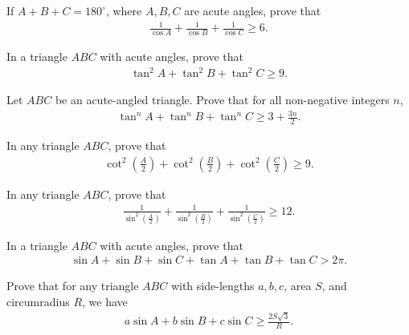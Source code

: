 \begin{question}
    If $A+B+C=180^\circ$, where $A,B,C$ are acute angles, prove that
    \begin{align*}
        \frac{1}{\cos A}+\frac{1}{\cos B}+\frac{1}{\cos C} \geq 6.
    \end{align*}
\end{question}


\begin{question}
    In a triangle $ABC$ with acute angles, prove that
    \begin{align*}
        \tan^2 A + \tan^2 B + \tan^2 C \geq 9.
    \end{align*}
\end{question}


\begin{question}
    Let $ABC$ be an acute-angled triangle. Prove that for all non-negative integers $n$,
    \begin{align*}
        \tan^n A + \tan^n B + \tan^n C \geq 3+\frac{3n}{2}.
    \end{align*}
\end{question}


\begin{question}
    In any triangle $ABC$, prove that
    \begin{align*}
        \cot^2\left(\frac{A}{2}\right) + \cot^2\left(\frac{B}{2}\right) + \cot^2\left(\frac{C}{2}\right) \geq 9.
    \end{align*}
\end{question}



\begin{question}
    In any triangle $ABC$, prove that
    \begin{align*}
        \frac{1}{\displaystyle\sin^2\left(\frac{A}{2}\right)}+\frac{1}{\displaystyle\sin^2\left(\frac{B}{2}\right)}+\frac{1}{\displaystyle\sin^2\left(\frac{C}{2}\right)} \geq 12.
    \end{align*}
\end{question}

\begin{question}
    In a triangle $ABC$ with acute angles, prove that
    \begin{align*}
        \sin A + \sin B + \sin C + \tan A + \tan B + \tan C > 2\pi. 
    \end{align*}
\end{question}


\begin{question}
    Prove that for any triangle $ABC$ with side-lengths $a,b,c$, area $S$, and circumradius $R$, we have
    \begin{align*}
        a\sin A + b\sin B + c\sin C \geq \frac{2S\sqrt{3}}{R}.
    \end{align*}
\end{question}

